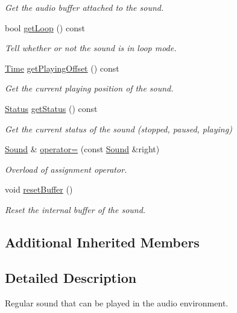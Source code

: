 \begin{DoxyCompactItemize}
\begin{DoxyCompactList}\small\item\em Get the audio buffer attached to the sound. \end{DoxyCompactList}\item 
bool \hyperlink{classsf_1_1_sound_a603fbd32b519ae1680c40d8ddfc7ea51}{get\+Loop} () const 
\begin{DoxyCompactList}\small\item\em Tell whether or not the sound is in loop mode. \end{DoxyCompactList}\item 
\hyperlink{classsf_1_1_time}{Time} \hyperlink{classsf_1_1_sound_aeca741a3442d9934369a986ad40f19c0}{get\+Playing\+Offset} () const 
\begin{DoxyCompactList}\small\item\em Get the current playing position of the sound. \end{DoxyCompactList}\item 
\hyperlink{classsf_1_1_sound_source_ac43af72c98c077500b239bc75b812f03}{Status} \hyperlink{classsf_1_1_sound_ae8b4084ff8f460b7a2bf9d39e846dab9}{get\+Status} () const 
\begin{DoxyCompactList}\small\item\em Get the current status of the sound (stopped, paused, playing) \end{DoxyCompactList}\item 
\hyperlink{classsf_1_1_sound}{Sound} \& \hyperlink{classsf_1_1_sound_a08c64c9c1dabeebc59fbf2540d81d4dd}{operator=} (const \hyperlink{classsf_1_1_sound}{Sound} \&right)
\begin{DoxyCompactList}\small\item\em Overload of assignment operator. \end{DoxyCompactList}\item 
void \hyperlink{classsf_1_1_sound_acb7289d45e06fb76b8292ac84beb82a7}{reset\+Buffer} ()
\begin{DoxyCompactList}\small\item\em Reset the internal buffer of the sound. \end{DoxyCompactList}\end{DoxyCompactItemize}
\subsection*{Additional Inherited Members}


\subsection{Detailed Description}
Regular sound that can be played in the audio environment. 

